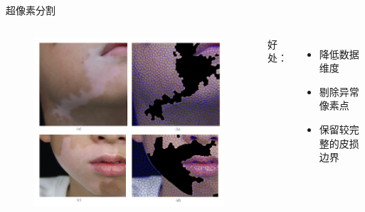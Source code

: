 \begin{frame}{超像素分割}
\begin{columns}[c]
\begin{figure}
    \centering
    \includegraphics[width=\linewidth]{figures/chap3_SLICresult2.png}
\end{figure}

好处：
\begin{itemize}
\item 降低数据维度
\item 剔除异常像素点
\item 保留较完整的皮损边界
\end{itemize}
\end{columns}
\end{frame}
